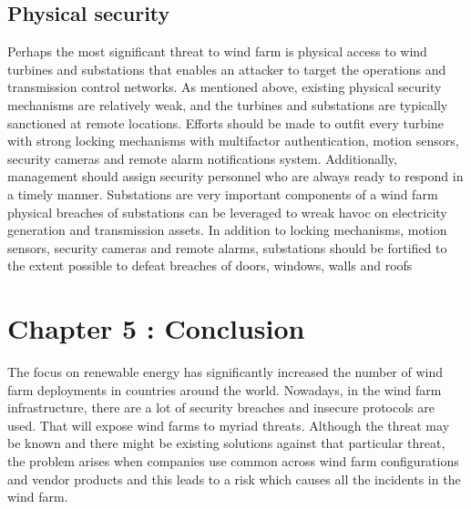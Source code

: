 \documentclass[twosided,a4,10pt]{article}
\begin{document}
\begin{multicols}{2}
\subsection{Physical security} 
Perhaps the most significant threat to wind farm is physical access to wind turbines and substations that enables an attacker to target the operations and transmission control networks. As mentioned above, existing physical security mechanisms are relatively weak, and the turbines and substations are typically sanctioned at remote locations. Efforts should be made to outfit every turbine with strong locking mechanisms with multifactor authentication, motion sensors, security cameras and remote alarm notifications system. Additionally, management should assign security personnel who are always ready to respond in a timely manner. Substations are very important components of a wind farm physical breaches of substations can be leveraged to wreak havoc on electricity generation and transmission assets. In addition to locking mechanisms, motion sensors, security cameras and remote alarms, substations should be fortified to the extent possible to defeat breaches of doors, windows, walls and roofs

\section{Chapter 5 : Conclusion }
The focus on renewable energy has significantly increased the number of wind farm deployments in countries around the world. Nowadays, in the wind farm infrastructure, there are a lot of security breaches and insecure protocols are used. That will expose wind farms to myriad threats. Although the threat may be known and there might be existing solutions against that particular threat, the problem arises when companies use common across wind farm configurations and vendor products and this leads to a risk which causes all the incidents in the wind farm.







\end{multicols}
\end{document}
